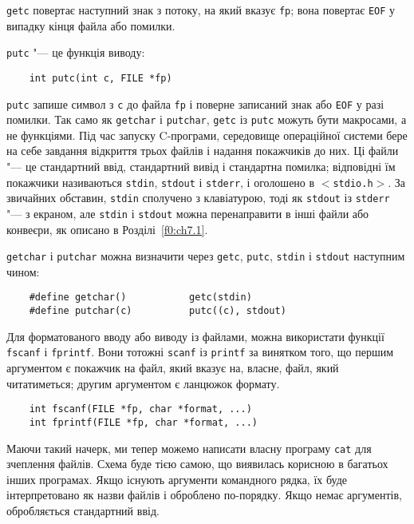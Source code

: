 \documentclass[a4paper,12pt]{book}
\begin{document}
  \texttt{getc} повертає наступний знак з потоку, на який вказує \texttt{fp}; вона
  повертає \texttt{EOF} у випадку кінця файла або помилки.

  \texttt{putc} "--- це функція виводу:
  \begin{verbatim}
    int putc(int c, FILE *fp)
  \end{verbatim}

  \texttt{putc} запише символ з \texttt{c} до файла \texttt{fp} і поверне записаний знак
  або \texttt{EOF} у разі помилки. Так само як \texttt{getchar} і \texttt{putchar},
  \texttt{getc} із \texttt{putc} можуть бути макросами, а не функціями. Під час запуску
  C-програми, середовище операційної системи бере на себе завдання відкриття трьох файлів
  і надання покажчиків до них. Ці файли "--- це стандартний ввід, стандартний вивід і
  стандартна помилка; відповідні їм покажчики називаються \texttt{stdin}, \texttt{stdout}
  і \texttt{stderr}, і оголошено в \texttt{\mbox{$<$}stdio.h\mbox{$>$}}. За звичайних обставин,
  \texttt{stdin} сполучено з клавіатурою, тоді як \texttt{stdout} із \texttt{stderr}
  "--- з екраном, але \texttt{stdin} і \texttt{stdout} можна перенаправити в інші файли
  або конвеєри, як описано в Розділі~\ref{f0:ch7.1}.

  \texttt{getchar} і \texttt{putchar} можна визначити через \texttt{getc}, \texttt{putc},
  \texttt{stdin} і \texttt{stdout} наступним чином:
  \begin{verbatim}
    #define getchar()           getc(stdin)
    #define putchar(c)          putc((c), stdout)
  \end{verbatim}

  Для форматованого вводу або виводу із файлами, можна використати функції \texttt{fscanf}
  і \texttt{fprintf}. Вони тотожні \texttt{scanf} із \texttt{printf} за винятком того, що
  першим аргументом є покажчик на файл, який вказує на, власне, файл, який читатиметься;
  другим аргументом є ланцюжок формату.

  \begin{verbatim}
    int fscanf(FILE *fp, char *format, ...)
    int fprintf(FILE *fp, char *format, ...)
  \end{verbatim}

  Маючи такий начерк, ми тепер можемо написати власну програму \texttt{cat} для зчеплення
  файлів. Схема буде тією самою, що виявилась корисною в багатьох інших програмах. Якщо
  існують аргументи командного рядка, їх буде інтерпретовано як назви файлів і оброблено
  по-порядку. Якщо немає аргументів, обробляється стандартний ввід.
\end{document}
